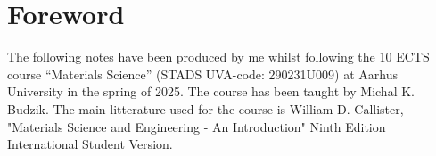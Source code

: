 \section{Foreword}
The following notes have been produced by me whilst following the 10 ECTS course ``Materials Science'' (STADS UVA-code: 290231U009) at Aarhus University in the spring of 2025. The course has been taught by Michal K. Budzik. The main litterature used for the course is William D. Callister, "Materials Science and Engineering - An Introduction" Ninth Edition International Student Version.

